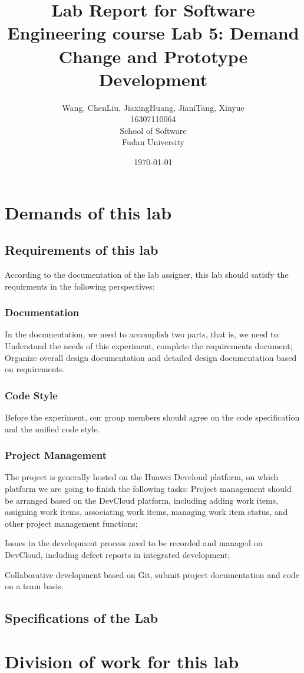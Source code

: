 \documentclass[a4paper]{report}
\title{Lab Report for Software Engineering course \newline
 Lab 5: Demand Change and Prototype Development}
\author{Wang, Chen\qquad Liu, Jiaxing\qquad Huang, Jiani\qquad Tang, Xinyue \\
16307110064\qquad17302010049\qquad 17302010063\qquad 16307110476 \\
School of Software\\
Fudan University
}
\date{\today}
\begin{document}
\maketitle

\tableofcontents
\chapter{Demands of this lab}
\section{Requirements of this lab}
According to the documentation of the lab assigner, this lab should satisfy the requirments in the following perspectives:
\subsection{Documentation}
In the documentation, we need to accomplish two parts, that is, we need to:
Understand the needs of this experiment, complete the requirements document;
Organize overall design documentation and detailed design documentation based on requirements.
\subsection{Code Style}
Before the experiment, our group members should agree on the code specification and the unified code style.
\subsection{Project Management}
The project is generally hosted on the Huawei Devcloud platform, on which platform we are going to finish the following tasks:
Project management should be arranged based on the DevCloud platform, including adding work items, assigning work items, associating work items, managing work item status, and other project management functions;
\par
Issues in the development process need to be recorded and managed on DevCloud, including defect reports in integrated development;
\par
Collaborative development based on Git, submit project documentation and code on a team basis.
\section{Specifications of the Lab}

\chapter{Division of work for this lab}
\end{document}
